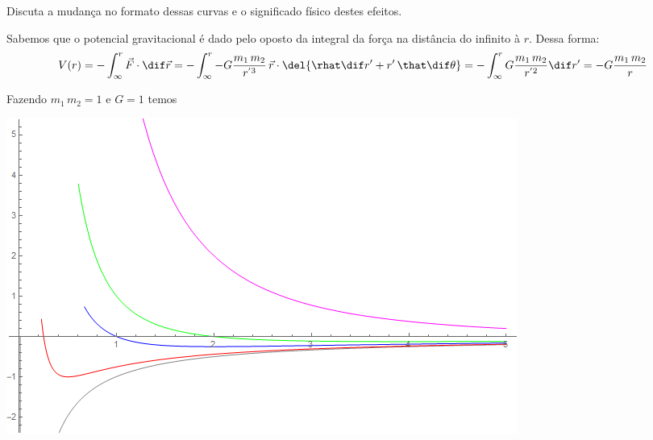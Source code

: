 \documentclass[]{IMTexam}
\begin{document}
\begin{questions}
\begin{parts}
		Discuta a mudança no formato dessas curvas e o significado físico destes efeitos.

		\begin{solution}
			Sabemos que o potencial gravitacional é dado pelo oposto da integral da força na distância do infinito à $ r $. Dessa forma:
			\begin{equation}\label{eq:Vpot}
				V(r)=-\int_\infty^r \vec{F}\cdot\dif\vec{r}=-\int_\infty^r -G\dfrac{m_1\,m_2}{r^{'3}}\,\vec{r}\cdot\del{\rhat\dif r'+r'\,\that\dif \theta}=-\int_\infty^r G\dfrac{m_1\,m_2}{r^{'2}}\dif r'=-G\dfrac{m_1\,m_2}{r}
			\end{equation}

			Fazendo $ m_1\,m_2=1 $ e $ G=1 $ temos
			\begin{center}
				\begin{minipage}{0.8\linewidth}
					\centering
					\includegraphics[width=1\linewidth]{Graph1}
				\end{minipage}\hfill
				\begin{minipage}{0.15\linewidth}
					\centering

\end{minipage}
\end{center}
\end{solution}
\end{parts}
\end{questions}
\end{document}
